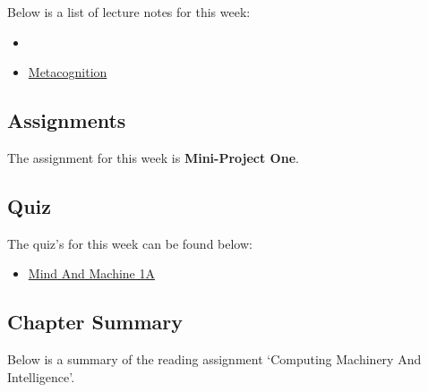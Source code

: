 \noindent Below is a list of lecture notes for this week:

\begin{itemize}
    \item {}
    \item \href{https://www.ldatschool.ca/metacognitive-strategies-or-thinking-about-my-thinking/}{Metacognition}
\end{itemize}

\subsection{Assignments}

The assignment for this week is \textbf{Mini-Project One}.  

\subsection{Quiz}

The quiz's for this week can be found below:

\begin{itemize}
    \item \href{https://applied.cs.colorado.edu/mod/quiz/view.php?id=49318}{Mind And Machine 1A}  
\end{itemize}

\subsection{Chapter Summary}

Below is a summary of the reading assignment `Computing Machinery And Intelligence'.

